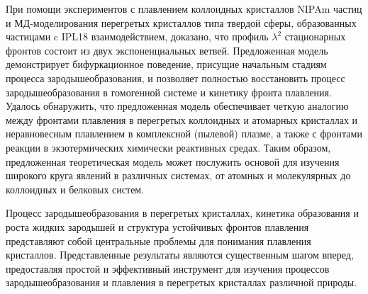 При помощи экспериментов с плавлением коллоидных кристаллов NIPAm частиц и МД-моделирования перегретых кристаллов типа твердой сферы, образованных частицами c IPL18 взаимодействием, доказано, что профиль $\lambda^2 $ стационарных фронтов состоит из двух экспоненциальных ветвей.
Предложенная модель демонстрирует бифуркационное поведение, присущие начальным стадиям процесса зародышеобразования, и позволяет полностью восстановить процесс зародышеобразования в гомогенной системе и кинетику фронта плавления.
Удалось обнаружить, что предложенная модель обеспечивает четкую аналогию между фронтами плавления в перегретых коллоидных и атомарных кристаллах и неравновесным плавлением в комплексной (пылевой) плазме, а также с фронтами реакции в экзотермических химически реактивных средах.
Таким образом, предложенная теоретическая модель может послужить основой для изучения широкого круга явлений в различных системах, от атомных и молекулярных до коллоидных и белковых систем.

Процесс зародышеобразования в перегретых кристаллах, кинетика образования и роста жидких зародышей и структура устойчивых фронтов плавления представляют собой центральные проблемы для понимания плавления кристаллов.
Представленные результаты являются существенным шагом вперед, предоставляя простой и эффективный инструмент для изучения процессов зародышеобразования и плавления в перегретых кристаллах различной природы.



